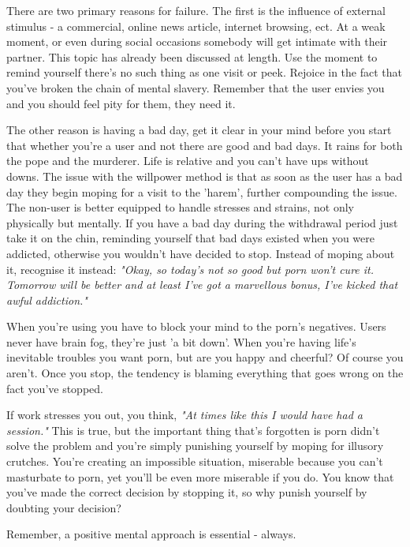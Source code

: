\documentclass[easypeasy.tex]{subfiles}
\begin{document}
There are two primary reasons for failure. The first is the influence of external stimulus - a commercial, online news article, internet browsing, ect. At a weak moment, or even during social occasions somebody will get intimate with their partner. This topic has already been discussed at length. Use the moment to remind yourself there's no such thing as one visit or peek. Rejoice in the fact that you've broken the chain of mental slavery. Remember that the user envies you and you should feel pity for them, they need it.

The other reason is having a bad day, get it clear in your mind before you start that whether you're a user and not there are good and bad days. It rains for both the pope and the murderer. Life is relative and you can't have ups without downs. The issue with the willpower method is that as soon as the user has a bad day they begin moping for a visit to the 'harem', further compounding the issue. The non-user is better equipped to handle stresses and strains, not only physically but mentally. If you have a bad day during the withdrawal period just take it on the chin, reminding yourself that bad days existed when you were addicted, otherwise you wouldn't have decided to stop. Instead of moping about it, recognise it instead: \textit{"Okay, so today's not so good but porn won't cure it. Tomorrow will be better and at least I've got a marvellous bonus, I've kicked that awful addiction."}

When you're using you have to block your mind to the porn's negatives. Users never have brain fog, they're just 'a bit down'. When you're having life's inevitable troubles you want porn, but are you happy and cheerful? Of course you aren't. Once you stop, the tendency is blaming everything that goes wrong on the fact you've stopped.

If work stresses you out, you think, \textit{"At times like this I would have had a session."} This is true, but the important thing that's forgotten is porn didn't solve the problem and you're simply punishing yourself by moping for illusory crutches. You're creating an impossible situation, miserable because you can't masturbate to porn, yet you'll be even more miserable if you do. You know that you've made the correct decision by stopping it, so why punish yourself by doubting your decision?

{\Large Remember, a positive mental approach is essential - always.}
\end{document}

